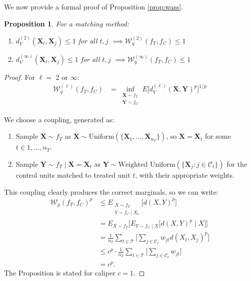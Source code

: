 \documentclass{article}
\newtheorem{proposition}[theorem]{Proposition}
\newcommand{\bX}{\mathbf{X}}
\newcommand{\Xt}{\mathbf{X}_t}
\newcommand{\Xj}{\mathbf{X}_j}
\newcommand{\Ct}{\mathcal{C}_{t}}
\begin{document}

We now provide a formal proof of Proposition \ref{prop:wass}.
\begin{proposition}
\label{prop:wass_real}
    For a matching method:
    \begin{enumerate}[label=(\alph*)]
        \item $d^{(2)}_V(\Xt, \Xj) \leq 1$ for all $t,j$ 
            $\implies \mathcal{W}^{(2)}_q(f_T, f_C) \leq 1$
        \item $d^{(\infty)}_V(\Xt, \Xj) \leq 1$ for all $t,j$ 
            $\implies \mathcal{W}^{(\infty)}_q(f_T, f_C) \leq 1$
    \end{enumerate}
\end{proposition}
\begin{proof}
    For $\ell = $ 2 or $\infty$:
    \begin{align*}
    \mathcal{W}_q^{(\ell)} (f_T, f_C) 
    &= \inf_{\substack{\bX \sim f_T \\ \mathbf{Y} \sim f_C}} E\big[ d_V^{(\ell)}(\bX, \mathbf{Y})^p \big]^{1/p}
    \end{align*}
    
    We choose a coupling, generated as:
    \begin{enumerate}
        \item Sample $\bX \sim f_T$ as $\bX \sim \text{Uniform}(\{\bX_1, \dots, \bX_{n_T}\})$, so $\bX = \Xt$ for some $t \in 1, \dots, n_T$.
        \item Sample $\mathbf{Y} \sim f_T \mid \bX = \Xt$ as $\mathbf{Y} \sim \text{Weighted Uniform}(\{\bX_j : j \in \Ct\})$ for the control units matched to treated unit $t$, with their appropriate weights.
    \end{enumerate}
    This coupling clearly produces the correct marginals, so we can write:
    \begin{align*}
    \mathcal{W}_p(f_T, f_C)^p
    &\leq E_{\substack{X \sim f_T \\ Y \sim f_C\mid X_t}} \big[ d(X, Y)^p \big] \\
    &= E_{X \sim f_T} \Big[ E_{Y \sim f_C \mid X} \big[ d(X,Y)^p \mid X \big] \Big] \\
    &= \frac{1}{n_T} \sum_{t \in \mathcal{T}} \Big[ \sum_{j \in \Ct} w_{jt} d(X_t, X_j)^p \Big] \\
    &\leq c^p \cdot \frac{1}{n_T} \sum_{t \in \mathcal{T}} \Big[ \sum_{j \in \Ct} w_{jt} \Big] \\
    &= c^p.
    \end{align*}
    The Proposition is stated for caliper $c=1$.
\end{proof}
\end{document}
